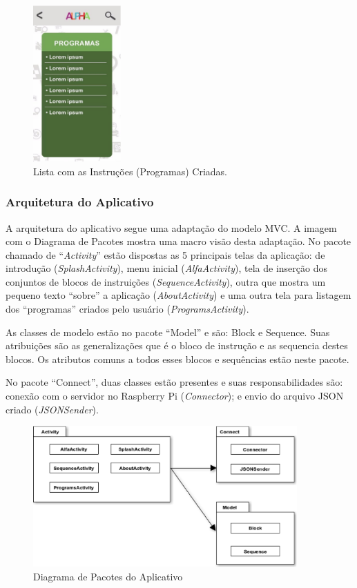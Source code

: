 \begin{figure}[H]
    \centering
    \includegraphics[width=0.3\textwidth]{figuras/list_of_programs.eps}
    \caption{Lista com as Instruções (Programas) Criadas.}
    \label{fig:list_of_programs}
\end{figure}

\subsubsection{Arquitetura do Aplicativo}

A arquitetura do aplicativo segue uma adaptação do modelo MVC. A imagem com o Diagrama de Pacotes mostra uma macro visão desta adaptação. No pacote chamado de “\textit{Activity}” estão dispostas as 5 principais telas da aplicação: de introdução (\textit{SplashActivity}), menu inicial (\textit{AlfaActivity}), tela de inserção dos conjuntos de blocos de instruições (\textit{SequenceActivity}), outra que mostra um pequeno texto “sobre” a aplicação (\textit{AboutActivity}) e uma outra tela para listagem dos “programas” criados pelo usuário (\textit{ProgramsActivity}).

As classes de modelo estão no pacote “Model” e são: Block e Sequence. Suas atribuições são as generalizações que é o bloco de instrução e as sequencia destes blocos. Os atributos comuns a todos esses blocos e sequências estão neste pacote.

No pacote “Connect”, duas classes estão presentes e suas responsabilidades são: conexão com o servidor no Raspberry Pi (\textit{Connector}); e envio do arquivo JSON criado (\textit{JSONSender}).

\begin{figure}[H]
    \centering
    \includegraphics[width=0.9\textwidth]{figuras/package.eps}
    \caption{Diagrama de Pacotes do Aplicativo}
    \label{fig:package}
\end{figure}


